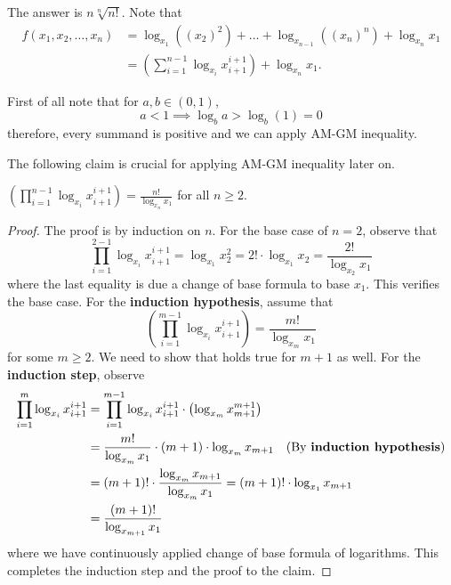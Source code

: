 \documentclass[numbers=endperiod, 11pt]{scrartcl}
\begin{document}
\begin{sol}
    The answer is $n \sqrt[n]{n!}$. Note that
    \begin{align*}
        f(x_1,x_2,\dots,x_n) & =  \log_{x_1} ((x_2)^2) + \dots + \log_{x_{n-1}} ((x_n)^n) + \log_{x_n} x_1 \\
                             & = \left(\sum_{i = 1}^{n-1}\log_{x_i} x_{i+1}^{i+1}\right) + \log_{x_n}x_1.
    \end{align*}

    \noindent First of all note that for $a,b \in (0,1)$,
    \[ a < 1 \implies \log_{b} a > \log_b(1) = 0\]
    therefore, every summand is positive and we can
    apply AM-GM inequality.

    The following claim is crucial for applying AM-GM
    inequality later on.
    \begin{claim*}
        $\displaystyle \left(\prod_{i = 1}^{n-1}\log_{x_i} x_{i+1}^{i+1}\right) = \frac{n!}{\log_{x_n}x_1}$
        for all $n \ge 2$.
    \end{claim*}
    \begin{proof}
        The proof is by induction on $n$. For the base case
        of $n = 2$, observe that
        \[\prod_{i = 1}^{2-1} \log_{x_i}x_{i+1}^{i+1} = \log_{x_1} x_2^2 = 2! \cdot \log_{x_1}{x_2} = \frac{2!}{\log_{x_2}{x_1}} \]
        where the last equality is due a change of base
        formula to base $x_1$. This verifies the base case.
        For the \textbf{induction hypothesis}, assume that
        \[\left(\prod_{i = 1}^{m-1}\log_{x_i} x_{i+1}^{i+1}\right) = \frac{m!}{\log_{x_m}x_1}\]
        for some $m \ge 2$. We need to show that holds true
        for $m + 1$ as well. For the \textbf{induction step},
        observe
        \begin{align*}
            \prod_{i = 1}^m \log_{x_i} x_{i+1}^{i+1} & = \prod_{i = 1}^{m-1} \log_{x_i} x_{i+1}^{i+1} \cdot \left( \log_{x_m}x_{m+1}^{m+1} \right)                    \\
                                                     & = \frac{m!}{\log_{x_m}x_1} \cdot (m+1)\cdot \log_{x_m} x_{m+1} \quad \text{(By \textbf{induction hypothesis})} \\
                                                     & = (m+1)! \cdot \frac{\log_{x_m} x_{m+1}}{\log_{x_m} x_{1}} = (m+1)!\cdot \log_{x_1} x_{m+1}                    \\
                                                     & = \frac{(m+1)!}{\log_{x_{m+1}} x_1}
        \end{align*}
        where we have continuously applied change of base
        formula of logarithms. This completes the induction
        step and the proof to the claim.
    \end{proof}


\end{sol}
\end{document}

